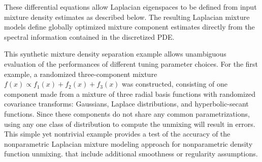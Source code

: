 \documentclass[10pt,letterpaper]{article}
\begin{document}
These differential equations allow Laplacian eigenspaces to be defined from input mixture density estimates as described below.
The resulting Laplacian mixture models define globally optimized mixture component estimates directly from the spectral information contained in the discretized PDE.

This synthetic mixture density separation example allows unambiguous evaluation of the performances of different tuning parameter choices.
For the first example, a randomized three-component mixture $f(x) \propto f_1(x) + f_2(x) + f_3(x)$ was constructed, consisting of one component made from a mixture of three radial basis functions with randomized covariance transforms: Gaussians, Laplace distributions, and hyperbolic-secant functions.
Since these components do not share any common parametrizations, using any one class of distribution to compute the unmixing will result in errors.
This simple yet nontrivial example provides a test of the accuracy of the nonparametric Laplacian mixture modeling approach for nonparametric density function unmixing.
that include additional smoothness or regularity assumptions.
\end{document}
